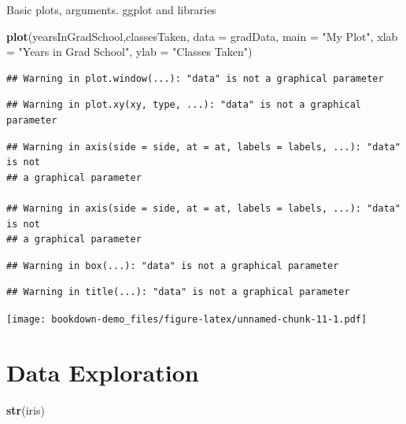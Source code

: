 \documentclass[]{book}
\newenvironment{Shaded}{\begin{snugshade}}{\end{snugshade}}
\newcommand{\KeywordTok}[1]{\textcolor[rgb]{0.13,0.29,0.53}{\textbf{#1}}}
\newcommand{\DataTypeTok}[1]{\textcolor[rgb]{0.13,0.29,0.53}{#1}}
\newcommand{\StringTok}[1]{\textcolor[rgb]{0.31,0.60,0.02}{#1}}
\newcommand{\NormalTok}[1]{#1}
\theoremstyle{definition}
\theoremstyle{definition}
\theoremstyle{definition}
\theoremstyle{remark}
\begin{document}
Basic plots, arguments. ggplot and libraries

\begin{Shaded}
\begin{Highlighting}[]
\KeywordTok{plot}\NormalTok{(yearsInGradSchool,classesTaken, }
     \DataTypeTok{data =}\NormalTok{ gradData, }
     \DataTypeTok{main =} \StringTok{"My Plot"}\NormalTok{, }
     \DataTypeTok{xlab =} \StringTok{"Years in Grad School"}\NormalTok{, }
     \DataTypeTok{ylab =} \StringTok{"Classes Taken"}\NormalTok{)}
\end{Highlighting}
\end{Shaded}

\begin{verbatim}
## Warning in plot.window(...): "data" is not a graphical parameter
\end{verbatim}

\begin{verbatim}
## Warning in plot.xy(xy, type, ...): "data" is not a graphical parameter
\end{verbatim}

\begin{verbatim}
## Warning in axis(side = side, at = at, labels = labels, ...): "data" is not
## a graphical parameter

## Warning in axis(side = side, at = at, labels = labels, ...): "data" is not
## a graphical parameter
\end{verbatim}

\begin{verbatim}
## Warning in box(...): "data" is not a graphical parameter
\end{verbatim}

\begin{verbatim}
## Warning in title(...): "data" is not a graphical parameter
\end{verbatim}

\texttt{[image: bookdown-demo\_files/figure-latex/unnamed-chunk-11-1.pdf]}

\section{Data Exploration}\label{data-exploration}

\begin{Shaded}
\begin{Highlighting}[]
\KeywordTok{str}\NormalTok{(iris)}
\end{Highlighting}
\end{Shaded}
\end{document}
